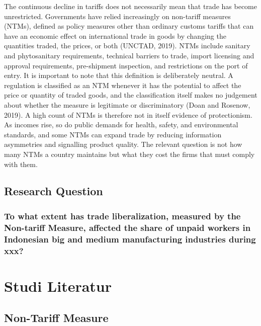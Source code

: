 \documentclass[
  manuscript=article,
  layout=publish,
  year=2026,
  volume=1,
]{den}
\begin{document}
The continuous decline in tariffs does not necessarily mean that trade
has become unrestricted. Governments have relied increasingly on
non-tariff measures (NTMs), defined as policy measures other than
ordinary customs tariffs that can have an economic effect on
international trade in goods by changing the quantities traded, the
prices, or both (UNCTAD, 2019). NTMs include sanitary and phytosanitary
requirements, technical barriers to trade, import licensing and approval
requirements, pre-shipment inspection, and restrictions on the port of
entry. It is important to note that this definition is deliberately
neutral. A regulation is classified as an NTM whenever it has the
potential to affect the price or quantity of traded goods, and the
classification itself makes no judgement about whether the measure is
legitimate or discriminatory (Doan and Rosenow, 2019). A high count of
NTMs is therefore not in itself evidence of protectionism. As incomes
rise, so do public demands for health, safety, and environmental
standards, and some NTMs can expand trade by reducing information
asymmetries and signalling product quality. The relevant question is not
how many NTMs a country maintains but what they cost the firms that must
comply with them.

\subsection{Research Question}\label{research-question}

\subsubsection{To what extent has trade liberalization, measured by the
Non-tariff Measure, affected the share of unpaid workers in Indonesian
big and medium manufacturing industries during
xxx?}\label{to-what-extent-has-trade-liberalization-measured-by-the-non-tariff-measure-affected-the-share-of-unpaid-workers-in-indonesian-big-and-medium-manufacturing-industries-during-xxx}

\section{Studi Literatur}\label{studi-literatur}

\subsection{Non-Tariff Measure}\label{non-tariff-measure}
\end{document}
